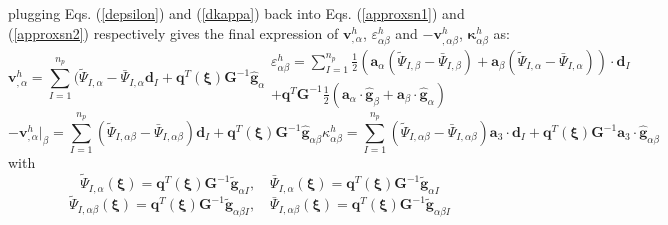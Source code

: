 plugging Eqs. (\ref{depsilon}) and (\ref{dkappa}) back into Eqs. (\ref{approxsn1}) and (\ref{approxsn2}) respectively gives the final expression of $\boldsymbol v^h_{,\alpha}$, $\varepsilon^h_{\alpha\beta}$ and $-\boldsymbol v^h_{,\alpha\beta}$, $\boldsymbol \kappa^h_{\alpha\beta}$ as:
\begin{subequations}
\begin{equation}
\boldsymbol v^h_{,\alpha} = \sum_{I=1}^{n_p}(
\tilde \Psi_{I,\alpha} -
\bar \Psi_{I,\alpha} \boldsymbol d_I +
\boldsymbol q^T(\boldsymbol \xi) \boldsymbol G^{-1}\hat{\boldsymbol g}_{\alpha}
\end{equation}
\begin{multline}
\varepsilon^h_{\alpha\beta} = \sum_{I=1}^{n_p} \frac{1}{2}\left (
\boldsymbol a_\alpha (\tilde \Psi_{I,\beta} - \bar \Psi_{I,\beta}) + \boldsymbol a_\beta(\tilde \Psi_{I,\alpha}-\bar \Psi_{I,\alpha})
\right )\cdot \boldsymbol d_I \\
+ \boldsymbol q^T \boldsymbol G^{-1} \frac{1}{2}(\boldsymbol a_\alpha \cdot \hat{\boldsymbol g}_{\beta} + \boldsymbol a_\beta \cdot \hat{\boldsymbol g}_{\alpha})
\end{multline}
\end{subequations}
\begin{subequations}
\begin{equation}
-\boldsymbol v^h_{,\alpha}\vert_\beta = \sum_{I=1}^{n_p} (
\tilde \Psi_{I,\alpha\beta} -
\bar \Psi_{I,\alpha\beta} ) \boldsymbol d_I +
\boldsymbol q^T(\boldsymbol \xi) \boldsymbol G^{-1}\hat{\boldsymbol g}_{\alpha\beta}
\end{equation}
\begin{equation}
\kappa^h_{\alpha\beta} = \sum_{I=1}^{n_p} (
\tilde \Psi_{I,\alpha\beta} -
\bar \Psi_{I,\alpha\beta} ) \boldsymbol a_3 \cdot \boldsymbol d_I +
\boldsymbol q^T(\boldsymbol \xi) \boldsymbol G^{-1}\boldsymbol a_3 \cdot \hat{\boldsymbol g}_{\alpha\beta}
\end{equation}
\end{subequations}
with
\begin{equation}
        \tilde{\Psi}_{I,\alpha}(\boldsymbol \xi) = \boldsymbol q^T(\boldsymbol \xi) \boldsymbol G^{-1} \tilde{\boldsymbol g}_{\alpha I}, \quad
        \bar{\Psi}_{I,\alpha}(\boldsymbol \xi) = \boldsymbol q^T(\boldsymbol \xi) \boldsymbol G^{-1} \tilde{\boldsymbol g}_{\alpha I}
\end{equation}
\begin{equation}
        \tilde{\Psi}_{I,\alpha\beta}(\boldsymbol \xi) = \boldsymbol q^T(\boldsymbol \xi) \boldsymbol G^{-1} \tilde{\boldsymbol g}_{\alpha\beta I}, \quad
        \bar{\Psi}_{I,\alpha\beta}(\boldsymbol \xi) = \boldsymbol q^T(\boldsymbol \xi) \boldsymbol G^{-1} \tilde{\boldsymbol g}_{\alpha\beta I}
\end{equation}

